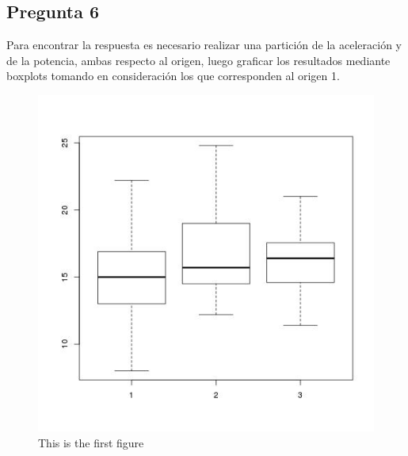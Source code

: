 \documentclass[letter,10pt]{article}
\begin{document}
\newpage
\subsection{Pregunta 6}

Para encontrar la respuesta es necesario realizar una partición de la aceleración y de la potencia, ambas respecto al origen, luego graficar los resultados
mediante boxplots tomando en consideración los que corresponden al origen 1.

  \begin{minipage}{\linewidth}
      \centering
      \begin{minipage}{0.45\linewidth}
          \begin{figure}[H]
              \includegraphics[width=\linewidth]{boxplot_acceleration_origin.jpg}
              \caption{This is the first figure}
          \end{figure}
      \end{minipage}
      \hspace{0.05\linewidth}
      \begin{minipage}{0.45\linewidth}
          \begin{figure}[H]

\end{figure}
\end{minipage}
\end{minipage}
\end{document}
